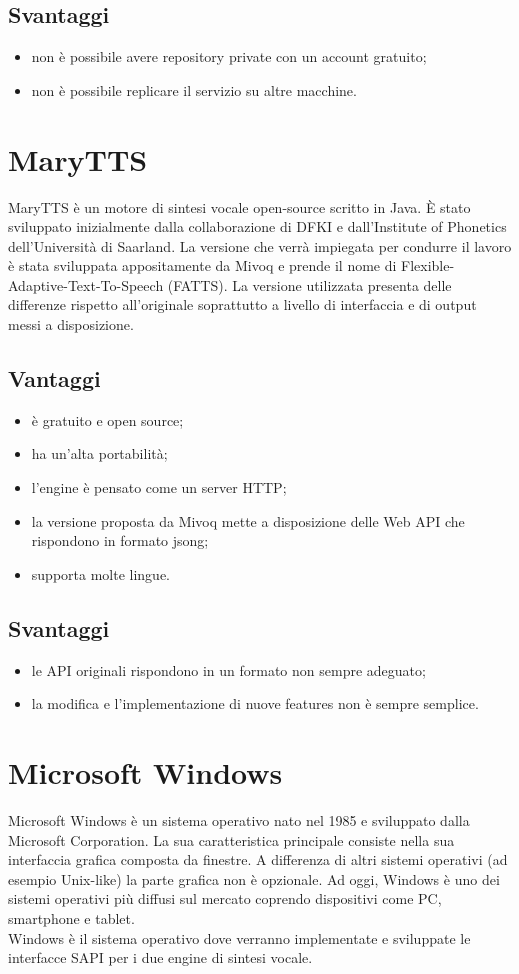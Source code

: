 \subsection*{Svantaggi}
\begin{itemize}
	\item non è possibile avere repository private con un account gratuito;
	\item non è possibile replicare il servizio su altre macchine.
\end{itemize}
\section{MaryTTS}
MaryTTS è un motore di sintesi vocale open-source scritto in Java. È stato sviluppato inizialmente dalla collaborazione di DFKI e dall'Institute of Phonetics dell'Università di Saarland. La versione che verrà impiegata per condurre il lavoro è stata sviluppata appositamente da Mivoq e prende il nome di Flexible-Adaptive-Text-To-Speech (FATTS). La versione utilizzata presenta delle differenze rispetto all'originale soprattutto a livello di interfaccia e di output messi a disposizione.
\subsection*{Vantaggi}
\begin{itemize}
	\item è gratuito e open source;
	\item ha un'alta portabilità;
	\item l'engine è pensato come un server HTTP;
	\item la versione proposta da Mivoq mette a disposizione delle Web API che rispondono in formato \gls{jsong};
	\item supporta molte lingue.
\end{itemize}
\subsection*{Svantaggi}
\begin{itemize}
	\item le API originali rispondono in un formato non sempre adeguato;
	\item la modifica e l'implementazione di nuove features non è sempre semplice.
\end{itemize}
\section{Microsoft Windows}
Microsoft Windows è un sistema operativo nato nel 1985 e sviluppato dalla Microsoft Corporation. La sua caratteristica principale consiste nella sua interfaccia grafica composta da finestre. A differenza di altri sistemi operativi (ad esempio Unix-like) la parte grafica non è opzionale. Ad oggi, Windows è uno dei sistemi operativi più diffusi sul mercato coprendo dispositivi come PC, smartphone e tablet.\\
Windows è il sistema operativo dove verranno implementate e sviluppate le interfacce SAPI per i due engine di sintesi vocale.
